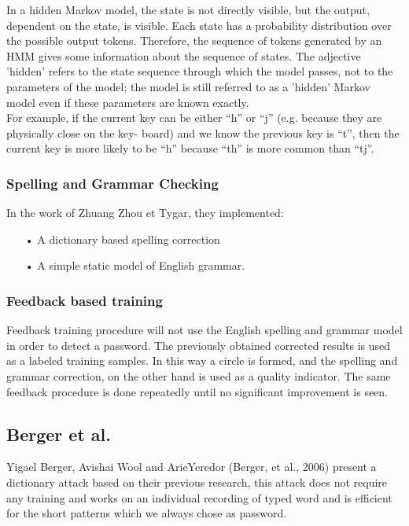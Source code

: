 \documentclass[12pt,a4paper]{article}
\begin{document}
In a hidden Markov model, the state is not directly visible, but the output, dependent on the state, is visible. Each state has a probability distribution over the possible output tokens. Therefore, the sequence of tokens generated by an HMM gives some information about the sequence of states. The adjective 'hidden' refers to the state sequence through which the model passes, not to the parameters of the model; the model is still referred to as a 'hidden' Markov model even if these parameters are known exactly.\\

For example, if the current key can be either “h” or “j” (e.g. because they are physically close on the key- board) and we know the previous key is “t”, then the current key is more likely to be “h” because “th” is more common than “tj”.\\

\subsubsection{Spelling and Grammar Checking}
In the work of Zhuang Zhou et Tygar, they implemented:\\
\begin{itemize}
\item[•] A dictionary based spelling correction
\item[•] A simple static model of English grammar.
\end{itemize}

\subsubsection{Feedback based training}

Feedback training procedure will not use the English spelling and grammar model in order to detect a password. The previously obtained corrected results is used as a labeled training samples. In this way a circle is formed, and the spelling and grammar correction, on the other hand is used as a quality indicator. The same feedback procedure is done repeatedly until no significant improvement is seen. \\
 
\subsection{Berger et al.}

Yigael Berger, Avishai Wool and ArieYeredor (Berger, et al., 2006) present a dictionary attack based on their previous research, this attack does not require any training and works on  an individual recording of typed word and is efficient for the short patterns which we always chose as password.\\
\end{document}
